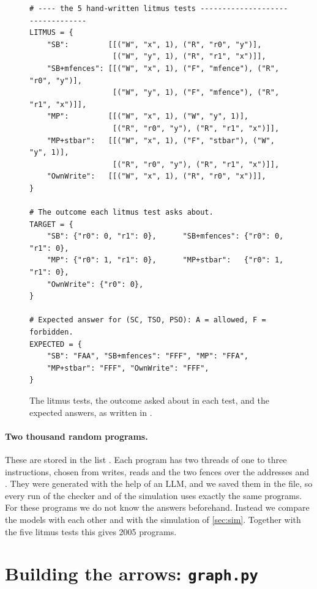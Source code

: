 \begin{figure}[!htbp]
\centering
\begin{lstlisting}[style=vspython]
# ---- the 5 hand-written litmus tests ---------------------------------
LITMUS = {
    "SB":         [[("W", "x", 1), ("R", "r0", "y")],
                   [("W", "y", 1), ("R", "r1", "x")]],
    "SB+mfences": [[("W", "x", 1), ("F", "mfence"), ("R", "r0", "y")],
                   [("W", "y", 1), ("F", "mfence"), ("R", "r1", "x")]],
    "MP":         [[("W", "x", 1), ("W", "y", 1)],
                   [("R", "r0", "y"), ("R", "r1", "x")]],
    "MP+stbar":   [[("W", "x", 1), ("F", "stbar"), ("W", "y", 1)],
                   [("R", "r0", "y"), ("R", "r1", "x")]],
    "OwnWrite":   [[("W", "x", 1), ("R", "r0", "x")]],
}

# The outcome each litmus test asks about.
TARGET = {
    "SB": {"r0": 0, "r1": 0},      "SB+mfences": {"r0": 0, "r1": 0},
    "MP": {"r0": 1, "r1": 0},      "MP+stbar":   {"r0": 1, "r1": 0},
    "OwnWrite": {"r0": 0},
}

# Expected answer for (SC, TSO, PSO): A = allowed, F = forbidden.
EXPECTED = {
    "SB": "FAA", "SB+mfences": "FFF", "MP": "FFA",
    "MP+stbar": "FFF", "OwnWrite": "FFF",
}
\end{lstlisting}
\caption{The litmus tests, the outcome asked about in each test, and the expected answers, as written in .}
\label{fig:testscode}
\end{figure}

\paragraph{Two thousand random programs.} These are stored in the list . Each program has two threads of one to three instructions, chosen from writes, reads and the two fences over the addresses  and . They were generated with the help of an LLM, and we saved them in the file, so every run of the checker and of the simulation uses exactly the same programs. For these programs we do not know the answers beforehand. Instead we compare the models with each other and with the simulation of \cref{sec:sim}. Together with the five litmus tests this gives 2005 programs.

\section{Building the arrows: \texttt{graph.py}}
\label{sec:graphfile}

